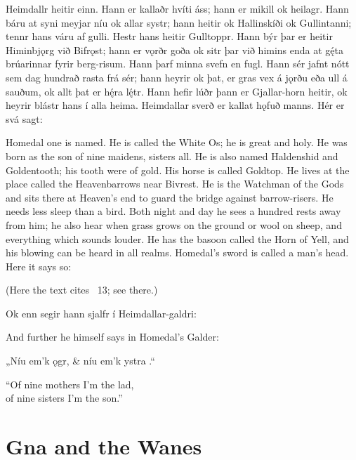 \sectionline

\bpg\bpa Heimdallr heitir einn. Hann er kallaðr hvíti áss; hann er mikill ok heilagr. Hann báru at syni meyjar níu ok allar systr; hann heitir ok Hallinskíði ok Gullintanni; tennr hans váru af gulli. Hestr hans heitir Gulltoppr. Hann býr þar er heitir Himinbjǫrg við Bifrǫst; hann er vǫrðr goða ok sitr þar við himins enda at gę́ta brúarinnar fyrir berg-risum. Hann þarf minna svefn en fugl. Hann sér jafnt nótt sem dag hundrað rasta frá sér; hann heyrir ok þat, er gras vex á jǫrðu eða ull á sauðum, ok allt þat er hę́ra lę́tr. Hann hefir lúðr þann er Gjallar-horn heitir, ok heyrir blástr hans í alla heima. Heimdallar sverð er kallat hǫfuð manns. Hér er svá sagt:\epa

\bpb Homedal one is named.  He is called the White Os; he is great and holy.  He was born as the son of nine maidens, sisters all.  He is also named Haldenshid and Goldentooth; his tooth were of gold.  His horse is called Goldtop.  He lives at the place called the Heavenbarrows near Bivrest.  He is the Watchman of the Gods and sits there at Heaven’s end to guard the bridge against barrow-risers.  He needs less sleep than a bird.  Both night and day he sees a hundred rests away from him; he also hear when grass grows on the ground or wool on sheep, and everything which sounds louder. He has the basoon called the Horn of Yell, and his blowing can be heard in all realms.  Homedal’s sword is called a man’s head.  Here it says so:\epb\epg

\sectionline

(Here the text cites \Grimnismal\ 13; see there.)

\sectionline

\bpg\bpa Ok enn segir hann sjalfr í Heimdallar-galdri:\epa

\bpb And further he himself says in Homedal’s Galder:\epb\epg


\bvg\bva „Níu em’k  ǫgr, &
níu em’k ystra .“\eva

\bvb “Of nine mothers I’m the lad, \\
of nine sisters I’m the son.”\evb\evg

\sectionline

\section{Gna and the Wanes}

